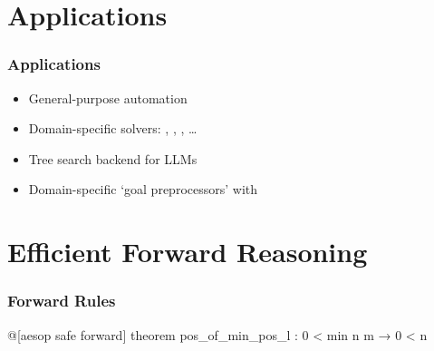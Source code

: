 \documentclass[xetex]{beamer}
\newcommand{\orange}[1]{\textcolor{orange}{#1}}
\begin{document}
\section{Applications}

\begin{frame}
  \frametitle{Applications}

  \begin{itemize}[<+->]
    \item General-purpose automation
    \item Domain-specific solvers: , , , \dots
    \item Tree search backend for LLMs
    \item Domain-specific \enquote*{goal preprocessors} with 
  \end{itemize}
\end{frame}

\section{Efficient Forward Reasoning}

\begin{frame}[fragile]
  \frametitle{Forward Rules}

  \begin{leancode}
    @[aesop safe forward]
    theorem pos_of_min_pos_l : 0 < min n m → 0 < n
  \end{leancode}

  \begin{tcolorbox}
    \begin{center}
    \end{center}
  \end{tcolorbox}
\end{frame}
\end{document}
